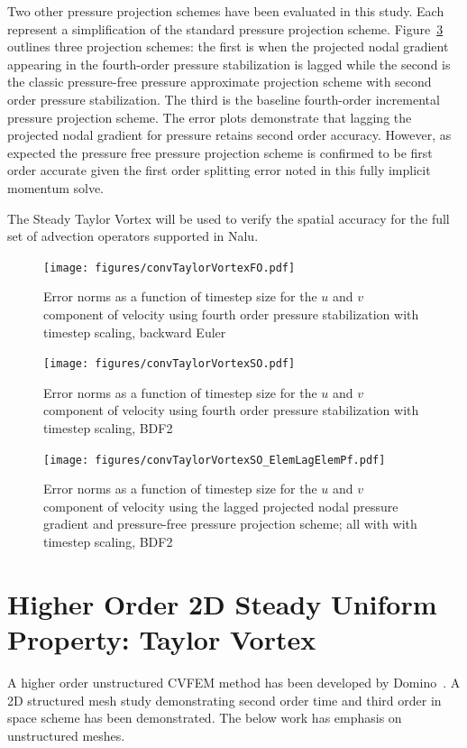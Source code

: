 Two other pressure projection schemes have been evaluated in this study. Each represent a 
simplification of the standard pressure projection scheme. Figure~\ref{fig:hybridTstep} outlines
three projection schemes: the first is when the projected nodal gradient appearing in the fourth-order pressure stabilization is lagged while the second is the classic pressure-free pressure approximate projection scheme with second order pressure stabilization. The third is the baseline fourth-order incremental pressure projection scheme. The error plots demonstrate that lagging the projected nodal gradient for pressure retains second order accuracy. However, as expected the pressure
free pressure projection scheme is confirmed to be first order accurate given the first order splitting error noted in this fully implicit momentum solve.

The Steady Taylor Vortex will be used to verify the spatial accuracy for the full set of advection
operators supported in Nalu.
 
\begin{figure}
\centerline{\texttt{[image: figures/convTaylorVortexFO.pdf]}}
\caption{Error norms as a function of timestep size for the $u$ and $v$
component of velocity using fourth order pressure stabilization with timestep scaling, backward Euler}
\label{fig:fo4thTstep}
\end{figure}

\begin{figure}
\centerline{\texttt{[image: figures/convTaylorVortexSO.pdf]}}
\caption{Error norms as a function of timestep size for the $u$ and $v$
component of velocity using fourth order pressure stabilization with timestep scaling, BDF2}
\label{fig:so4thTstep}
\end{figure}

\begin{figure}
\centerline{\texttt{[image: figures/convTaylorVortexSO\_ElemLagElemPf.pdf]}}
\caption{Error norms as a function of timestep size for the $u$ and $v$
component of velocity using the lagged projected nodal pressure gradient and pressure-free pressure projection scheme; all with with timestep scaling, BDF2}
\label{fig:hybridTstep}
\end{figure}

\section{Higher Order 2D Steady Uniform Property: Taylor Vortex}

A higher order unstructured CVFEM method has been developed by Domino~\cite{Domino:2014}. 
A 2D structured mesh study demonstrating second order time and third order in space scheme 
has been demonstrated. The below work has emphasis on unstructured meshes.

